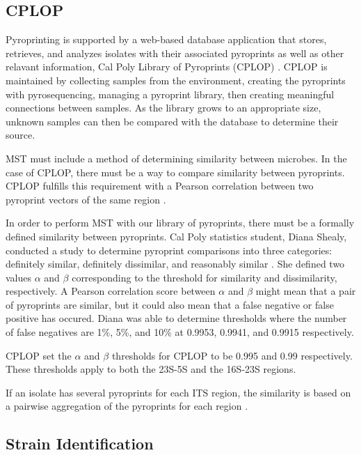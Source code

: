 \subsection{CPLOP}
\label{cplop}

Pyroprinting is supported by a web-based database application that stores, retrieves, and analyzes isolates with their associated pyroprints as well as other relavant information, Cal Poly Library of Pyroprints (CPLOP) \cite{JanSoliman}. CPLOP is maintained by collecting samples from the environment, creating the pyroprints with pyrosequencing, managing a pyroprint library, then creating meaningful connections between samples. As the library grows to an appropriate size, unknown samples can then be compared with the database to determine their source. 

MST must include a method of determining similarity between microbes. In the case of CPLOP, there must be a way to compare similarity between pyroprints. CPLOP fulfills this requirement with a Pearson correlation between two pyroprint vectors of the same region \cite{AldrinMontana}.

In order to perform MST with our library of pyroprints, there must be a formally defined similarity between pyroprints. Cal Poly statistics student, Diana Shealy, conducted a study to determine pyroprint comparisons into three categories: definitely similar, definitely dissimilar, and reasonably similar \cite{DianaShealey}. She defined two values $\alpha$ and $\beta$ corresponding to the threshold for similarity and dissimilarity, respectively. A Pearson correlation score between $\alpha$ and $\beta$ might mean that a pair of pyroprints are similar, but it could also mean that a false negative or false positive has occured. Diana was able to determine thresholds where the number of false negatives are 1\%, 5\%, and 10\% at 0.9953, 0.9941, and 0.9915 respectively.

CPLOP \cite{JanSoliman} set the $\alpha$ and $\beta$ thresholds for CPLOP to be 0.995 and 0.99 respectively. These thresholds apply to both the 23S-5S and the 16S-23S regions.

If an isolate has several pyroprints for each ITS region, the similarity is based on a pairwise aggregation of the pyroprints for each region \cite{JanSoliman}.

\subsection{Strain Identification}
\label{strain-identification}

